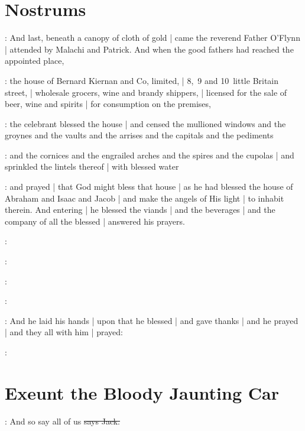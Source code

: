 \section{Nostrums}

:
And last,
beneath a canopy of cloth of gold |
came the reverend Father O'Flynn |
attended by Malachi and Patrick.
And when the good fathers had reached the appointed place,

:
the house of Bernard Kiernan and Co,
limited, |
8,~9 and 10~little Britain street, |
wholesale grocers,
wine and brandy shippers, |
licensed for the sale of beer,
wine and spirits |
for consumption on the premises,

:
the celebrant blessed the house |
and censed the mullioned windows
and the groynes
and the vaults
and the arrises
and the capitals
and the pediments

:
and the cornices
and the engrailed arches
and the spires
and the cupolas |
and sprinkled the lintels thereof |
with blessed water

:
and prayed |
that God might bless that house |
as he had blessed the house of Abraham and Isaac and Jacob |
and make the angels of His light |
to inhabit therein.
And entering |
he blessed the viands |
and the beverages |
and the company of all the blessed |
answered his prayers.

:

:

:

:

:
And he laid his hands |
upon that he blessed |
and gave thanks |
and he prayed |
and they all with him |
prayed:

\All:


\section{Exeunt the Bloody Jaunting Car}

\power:
And so say all of us
\sout{says Jack.}

